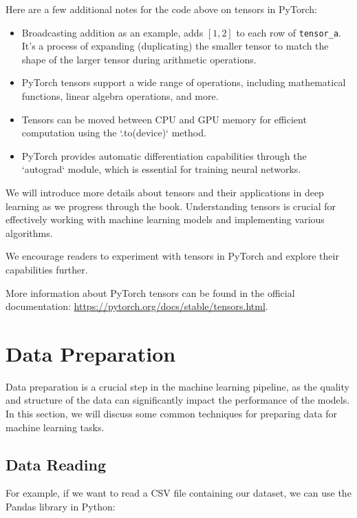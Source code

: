 \begin{remark}
Here are a few additional notes for the code above on tensors in PyTorch:
\begin{itemize}
    \item Broadcasting addition as an example, adds $[1, 2]$ to each row of \texttt{tensor\_a}. It's a process of expanding (duplicating) the smaller tensor to match the shape of the larger tensor during arithmetic operations.
    \item PyTorch tensors support a wide range of operations, including mathematical functions, linear algebra operations, and more.
    \item Tensors can be moved between CPU and GPU memory for efficient computation using the `.to(device)` method.
    \item PyTorch provides automatic differentiation capabilities through the `autograd` module, which is essential for training neural networks.
\end{itemize}
\end{remark}

We will introduce more details about tensors and their applications in deep learning as we progress through the book. Understanding tensors is crucial for effectively working with machine learning models and implementing various algorithms.

We encourage readers to experiment with tensors in PyTorch and explore their capabilities further.

More information about PyTorch tensors can be found in the official documentation: \url{https://pytorch.org/docs/stable/tensors.html}.

\newpage

\section{Data Preparation}

Data preparation is a crucial step in the machine learning pipeline, as the quality and structure of the data can significantly impact the performance of the models. In this section, we will discuss some common techniques for preparing data for machine learning tasks.

\subsection{Data Reading}

For example, if we want to read a CSV file containing our dataset, we can use the Pandas library in Python:

